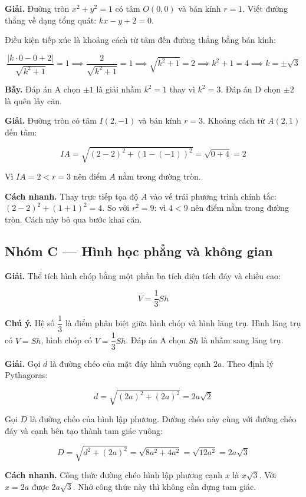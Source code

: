 \documentclass[11pt, a4paper]{article}
\begin{document}
\begin{dapan}[12 — Đáp án B]
\textbf{Giải.} Đường tròn $x^2 + y^2 = 1$ có tâm $O(0,0)$ và bán kính $r = 1$. Viết đường thẳng về dạng tổng quát: $kx - y + 2 = 0$.

Điều kiện tiếp xúc là khoảng cách từ tâm đến đường thẳng bằng bán kính:

$$\frac{|k \cdot 0 - 0 + 2|}{\sqrt{k^2 + 1}} = 1 \implies \frac{2}{\sqrt{k^2 + 1}} = 1 \implies \sqrt{k^2 + 1} = 2 \implies k^2 + 1 = 4 \implies k = \pm\sqrt{3}$$

\textbf{Bẫy.} Đáp án A chọn $\pm 1$ là giải nhầm $k^2 = 1$ thay vì $k^2 = 3$. Đáp án D chọn $\pm 2$ là quên lấy căn.
\end{dapan}

\begin{dapan}[13 — Đáp án B]
\textbf{Giải.} Đường tròn có tâm $I(2, -1)$ và bán kính $r = 3$. Khoảng cách từ $A(2,1)$ đến tâm:

$$IA = \sqrt{(2-2)^2 + (1-(-1))^2} = \sqrt{0 + 4} = 2$$

Vì $IA = 2 < r = 3$ nên điểm $A$ nằm trong đường tròn.

\textbf{Cách nhanh.} Thay trực tiếp tọa độ $A$ vào vế trái phương trình chính tắc: $(2-2)^2 + (1+1)^2 = 4$. So với $r^2 = 9$: vì $4 < 9$ nên điểm nằm trong đường tròn. Cách này bỏ qua bước khai căn.
\end{dapan}

\subsection*{Nhóm C — Hình học phẳng và không gian}

\begin{dapan}[14 — Đáp án C]
\textbf{Giải.} Thể tích hình chóp bằng một phần ba tích diện tích đáy và chiều cao:

$$V = \frac{1}{3}Sh$$

\textbf{Chú ý.} Hệ số $\dfrac{1}{3}$ là điểm phân biệt giữa hình chóp và hình lăng trụ. Hình lăng trụ có $V = Sh$, hình chóp có $V = \dfrac{1}{3}Sh$. Đáp án A chọn $Sh$ là nhầm sang lăng trụ.
\end{dapan}

\begin{dapan}[15 — Đáp án C]
\textbf{Giải.} Gọi $d$ là đường chéo của mặt đáy hình vuông cạnh $2a$. Theo định lý Pythagoras:

$$d = \sqrt{(2a)^2 + (2a)^2} = 2a\sqrt{2}$$

Gọi $D$ là đường chéo của hình lập phương. Đường chéo này cùng với đường chéo đáy và cạnh bên tạo thành tam giác vuông:

$$D = \sqrt{d^2 + (2a)^2} = \sqrt{8a^2 + 4a^2} = \sqrt{12a^2} = 2a\sqrt{3}$$

\textbf{Cách nhanh.} Công thức đường chéo hình lập phương cạnh $x$ là $x\sqrt{3}$. Với $x = 2a$ được $2a\sqrt{3}$. Nhớ công thức này thì không cần dựng tam giác.
\end{dapan}
\end{document}
